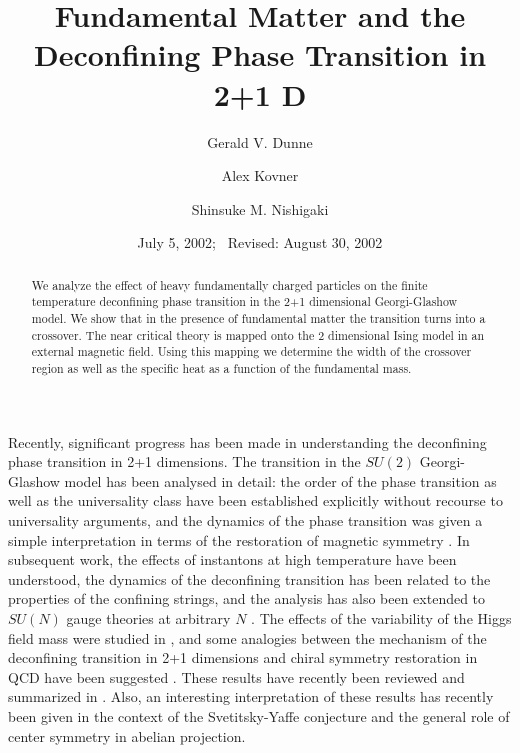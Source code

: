 \documentclass[a4paper,aps,prd,superscriptaddress,showpacs,showkeys]{revtex4}
\begin{document}
\preprint{}
\title{Fundamental Matter and the
Deconfining Phase Transition in 2+1 D}
\author{Gerald V. Dunne}
\author{Alex Kovner}
\author{Shinsuke M. Nishigaki}
\date{July 5, 2002;  \ Revised: August 30, 2002}
\begin{abstract}
We analyze the effect of heavy fundamentally charged particles on the
finite temperature deconfining phase transition in the
2+1 dimensional Georgi-Glashow model. We show that in the presence of
fundamental matter the transition turns into a crossover. The
near critical theory is mapped
onto the 2 dimensional Ising model in an external magnetic field.
Using this mapping we determine the width of the crossover region as well
as the specific heat as a function of the
fundamental mass.
\end{abstract}
\maketitle

Recently, significant progress has been made in understanding
the deconfining  phase transition in 2+1 dimensions. The transition in
the
$SU(2)$ Georgi-Glashow model has been analysed in detail:
the order of the phase transition as well as the universality class have
been established explicitly without recourse to universality
arguments,
and the dynamics of the phase transition was given a simple
interpretation
in terms of the restoration of magnetic symmetry \cite{gg1}.
In subsequent work, the effects of instantons at high temperature have
been  understood, the dynamics of the deconfining transition
has been related to the properties of the confining strings, and
the analysis has also been extended to $SU(N)$ gauge theories
at arbitrary $N$ \cite{gg2}. The effects
of the variability of the Higgs field mass were studied in
\cite{antonov}, and some analogies between the
mechanism of the deconfining transition in 2+1 dimensions and chiral
symmetry restoration in QCD have been suggested \cite{gg3}.
These results have recently been reviewed and summarized in \cite{kk}.
Also, an interesting interpretation of these results has recently been
given \cite{mike} in the context of the Svetitsky-Yaffe conjecture
\cite{sy} and the general role of center symmetry in abelian projection.
\end{document}
